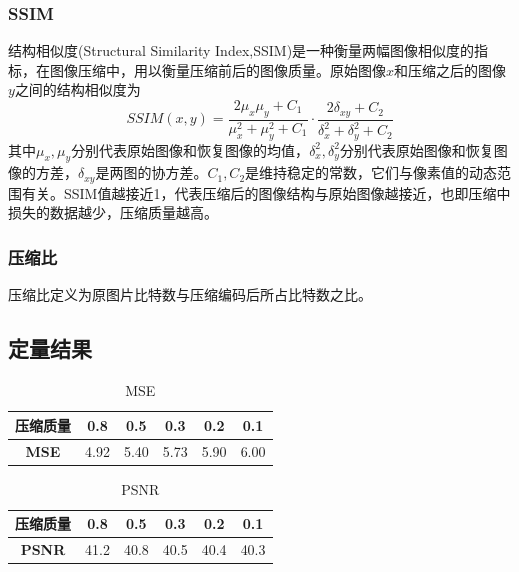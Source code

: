 \subsubsection{SSIM}
结构相似度(Structural Similarity Index,SSIM)是一种衡量两幅图像相似度的指标，在图像压缩中，用以衡量压缩前后的图像质量。原始图像$x$和压缩之后的图像$y$之间的结构相似度为
\begin{equation}
    SSIM(x,y)=\frac{2\mu_x\mu_y+C_1}{\mu_x^2+\mu_y^2+C_1}\cdot\frac{2\delta_{xy}+C_2}{\delta_x^2+\delta_y^2+C_2}
    \label{Eq.SSIM}
\end{equation}
其中$\mu_x,\mu_y$分别代表原始图像和恢复图像的均值，$\delta_x^2,\delta_y^2$分别代表原始图像和恢复图像的方差，$\delta_{xy}$是两图的协方差。$C_1,C_2$是维持稳定的常数，它们与像素值的动态范围有关。SSIM值越接近1，代表压缩后的图像结构与原始图像越接近，也即压缩中损失的数据越少，压缩质量越高。


\subsubsection{压缩比}
压缩比定义为原图片比特数与压缩编码后所占比特数之比。

\subsection{定量结果}

\begin{table}[h!]
    \begin{center}
        \caption{MSE}
        \begin{tabular}{c|ccccc}
            \textbf{压缩质量} & 0.8 & 0.5 & 0.3 & 0.2 & 0.1 \\
            \hline
            \textbf{MSE} & 4.92 & 5.40 & 5.73 & 5.90 & 6.00 \\
        \end{tabular}
    \end{center}
\end{table}


\begin{table}[h!]
    \begin{center}
        \caption{PSNR}
        \begin{tabular}{c|ccccc}
            \textbf{压缩质量} & 0.8 & 0.5 & 0.3 & 0.2 & 0.1 \\
            \hline
            \textbf{PSNR} & 41.2 & 40.8 & 40.5 & 40.4 & 40.3 \\
        \end{tabular}
    \end{center}
\end{table}

